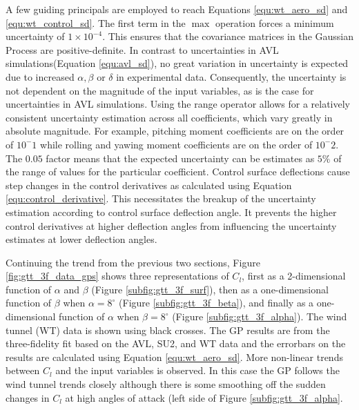 A few guiding principals are employed to reach Equations \ref{equ:wt_aero_sd} and \ref{equ:wt_control_sd}.
The first term in the $\max$ operation forces a minimum uncertainty of $1\times10^{-4}$.
This ensures that the covariance matrices in the Gaussian Process are positive-definite.
In contrast to uncertainties in AVL simulations(Equation \ref{equ:avl_sd}), no great variation in uncertainty is expected due to increased $\alpha, \beta$ or $\delta$ in experimental data. 
Consequently, the uncertainty is not dependent on the magnitude of the input variables, as is the case for uncertainties in AVL simulations. 
Using the range operator allows for a relatively consistent uncertainty estimation across all coefficients, which vary greatly in absolute magnitude. 
For example, pitching moment coefficients are on the order of $10^-1$ while rolling and yawing moment coefficients are on the order of $10^-2$.
The $0.05$ factor means that the expected uncertainty can be estimates as $5\%$ of the range of values for the particular coefficient. 
Control surface deflections cause step changes in the control derivatives as calculated using Equation \ref{equ:control_derivative}.
This necessitates the breakup of the uncertainty estimation according to control surface deflection angle. 
It prevents the higher control derivatives at higher deflection angles from influencing the uncertainty estimates at lower deflection angles.

Continuing the trend from the previous two sections, Figure \ref{fig:gtt_3f_data_gps} shows three representations of $C_l$, first as a 2-dimensional function of $\alpha$ and $\beta$ (Figure \ref{subfig:gtt_3f_surf}), then as a one-dimensional function of $\beta$ when $\alpha=8^\circ$ (Figure \ref{subfig:gtt_3f_beta}), and finally as a one-dimensional function of $\alpha$ when $\beta = 8^\circ$ (Figure \ref{subfig:gtt_3f_alpha}).
The wind tunnel (WT) data is shown using black crosses.
The GP results are from the three-fidelity fit based on the AVL, SU2, and WT data and the errorbars on the results are calculated using Equation \ref{equ:wt_aero_sd}.
More non-linear trends between $C_l$ and the input variables is observed.
In this case the GP follows the wind tunnel trends closely although there is some smoothing off the sudden changes in $C_l$ at high angles of attack (left side of Figure \ref{subfig:gtt_3f_alpha}.


